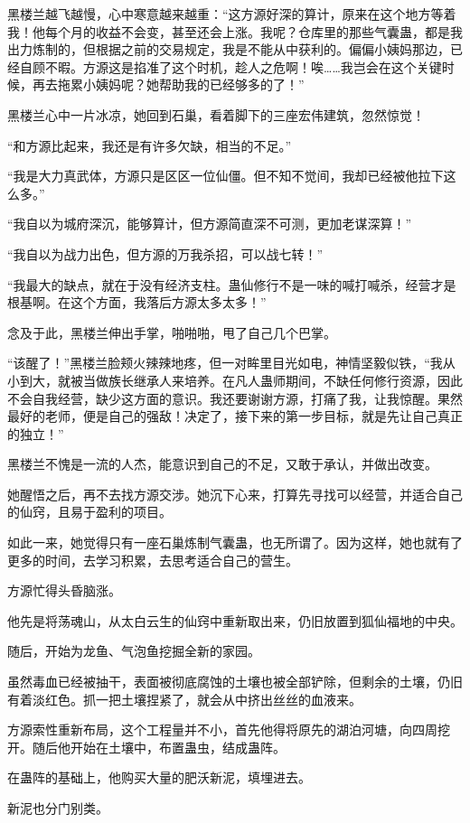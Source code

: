 \begin{this_body}
黑楼兰越飞越慢，心中寒意越来越重：“这方源好深的算计，原来在这个地方等着我！他每个月的收益不会变，甚至还会上涨。我呢？仓库里的那些气囊蛊，都是我出力炼制的，但根据之前的交易规定，我是不能从中获利的。偏偏小姨妈那边，已经自顾不暇。方源这是掐准了这个时机，趁人之危啊！唉……我岂会在这个关键时候，再去拖累小姨妈呢？她帮助我的已经够多的了！”

黑楼兰心中一片冰凉，她回到石巢，看着脚下的三座宏伟建筑，忽然惊觉！

“和方源比起来，我还是有许多欠缺，相当的不足。”

“我是大力真武体，方源只是区区一位仙僵。但不知不觉间，我却已经被他拉下这么多。”

“我自以为城府深沉，能够算计，但方源简直深不可测，更加老谋深算！”

“我自以为战力出色，但方源的万我杀招，可以战七转！”

“我最大的缺点，就在于没有经济支柱。蛊仙修行不是一味的喊打喊杀，经营才是根基啊。在这个方面，我落后方源太多太多！”

念及于此，黑楼兰伸出手掌，啪啪啪，甩了自己几个巴掌。

“该醒了！”黑楼兰脸颊火辣辣地疼，但一对眸里目光如电，神情坚毅似铁，“我从小到大，就被当做族长继承人来培养。在凡人蛊师期间，不缺任何修行资源，因此不会自我经营，缺少这方面的意识。我还要谢谢方源，打痛了我，让我惊醒。果然最好的老师，便是自己的强敌！决定了，接下来的第一步目标，就是先让自己真正的独立！”

黑楼兰不愧是一流的人杰，能意识到自己的不足，又敢于承认，并做出改变。

她醒悟之后，再不去找方源交涉。她沉下心来，打算先寻找可以经营，并适合自己的仙窍，且易于盈利的项目。

如此一来，她觉得只有一座石巢炼制气囊蛊，也无所谓了。因为这样，她也就有了更多的时间，去学习积累，去思考适合自己的营生。

方源忙得头昏脑涨。

他先是将荡魂山，从太白云生的仙窍中重新取出来，仍旧放置到狐仙福地的中央。

随后，开始为龙鱼、气泡鱼挖掘全新的家园。

虽然毒血已经被抽干，表面被彻底腐蚀的土壤也被全部铲除，但剩余的土壤，仍旧有着淡红色。抓一把土壤捏紧了，就会从中挤出丝丝的血液来。

方源索性重新布局，这个工程量并不小，首先他得将原先的湖泊河塘，向四周挖开。随后他开始在土壤中，布置蛊虫，结成蛊阵。

在蛊阵的基础上，他购买大量的肥沃新泥，填埋进去。

新泥也分门别类。


\end{this_body}
